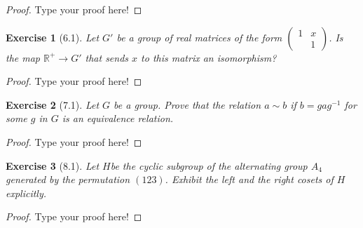 \documentclass[12pt,leqno]{article}
\numberwithin{equation}{section}
\newtheorem*{exer}{Exercise}
\theoremstyle{definition}
\begin{document}
\begin{proof}[Proof]
Type your proof here! 
\end{proof}

\begin{exer}[6.1]
Let $G'$ be a group of real matrices of the form $\left (  \begin{array}{cc}
 1 & x \\ 
   & 1 \end{array} \right )$. Is the map $\mathbb R^+ \rightarrow G'$ that sends $x$ to this  matrix an isomorphism?
\end{exer}

\begin{proof}[Proof]
Type your proof here!
\end{proof}

\begin{exer}[7.1]
Let $G$ be a group. Prove that the relation $a \sim b$ if $b=gag^{-1}$ for some $g$ in $G$ is an equivalence relation.
\end{exer}

\begin{proof}[Proof]
Type your proof here!
\end{proof}

\begin{exer}[8.1]
Let $H$be the cyclic subgroup of the alternating group $A_4$ generated by the permutation $(1 2 3)$. Exhibit the left and the right cosets of $H$ explicitly.
\end{exer}

\begin{proof}[Proof]
Type your proof here!
\end{proof}
\end{document}
